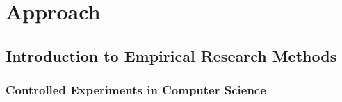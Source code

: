 \chapter{Approach}
\label{chapter:approach}










\section{Introduction to Empirical Research Methods}
















\subsection{Controlled Experiments in Computer Science}





